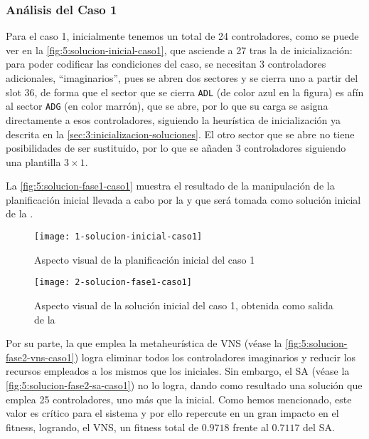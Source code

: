 \subsubsection{Análisis del Caso 1}

Para el caso 1, inicialmente tenemos un total de 24 controladores, como se puede ver en la \autoref{fig:5:solucion-inicial-caso1}, que asciende a 27 tras la \faseuno{} de inicialización: para poder codificar las condiciones del caso, se necesitan 3 controladores adicionales, ``imaginarios'', pues se abren dos sectores y se cierra uno a partir del slot 36, de forma que el sector que se cierra \texttt{ADL} (de color azul en la figura) es afín al sector \texttt{ADG} (en color marrón), que se abre, por lo que su carga se asigna directamente a esos controladores, siguiendo la heurística de inicialización ya descrita en la \autoref{sec:3:inicializacion-soluciones}. El otro sector que se abre no tiene posibilidades de ser sustituido, por lo que se añaden 3 controladores siguiendo una plantilla $3\times1$.

La \autoref{fig:5:solucion-fase1-caso1} muestra el resultado de la manipulación de la planificación inicial llevada a cabo por la \faseuno{} y que será tomada como solución inicial de la \fasedos{}.

\begin{figure}
	\centering
	\texttt{[image: 1-solucion-inicial-caso1]}
	\caption{Aspecto visual de la planificación inicial del caso 1}
	\label{fig:5:solucion-inicial-caso1}
\end{figure}

\begin{figure}
	\centering
	\texttt{[image: 2-solucion-fase1-caso1]}
	\caption{Aspecto visual de la solución inicial del caso 1, obtenida como salida de la \faseuno{}}
	\label{fig:5:solucion-fase1-caso1}
\end{figure}

Por su parte, la \fasedos{} que emplea la metaheurística de VNS (véase la \autoref{fig:5:solucion-fase2-vns-caso1}) logra eliminar todos los controladores imaginarios y reducir los recursos empleados a los mismos que los iniciales. Sin embargo, el SA (véase la \autoref{fig:5:solucion-fase2-sa-caso1}) no lo logra, dando como resultado una solución que emplea 25 controladores, uno más que la inicial. Como hemos mencionado, este valor es crítico para el sistema y por ello repercute en un gran impacto en el fitness, logrando, el VNS, un fitness total de $0.9718$ frente al $0.7117$ del SA. 

